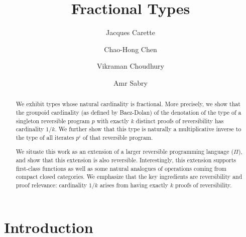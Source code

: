\documentclass[a4paper,USenglish]{lipics-v2016-utf8x}
\begin{document}
\title{Fractional Types}
\author[1]{Jacques Carette}
\author[2]{Chao-Hong Chen}
\author[3]{Vikraman Choudhury}
\author[4]{Amr Sabry}



\maketitle

\begin{abstract}
We exhibit types whose natural cardinality is fractional.  More
precisely, we show that the groupoid cardinality (as defined by
Baez-Dolan) of the denotation of the type of a singleton reversible
program $p$ with exactly $k$ distinct proofs of reversibility has
cardinality $1/k$.  We further show that this type is naturally a
multiplicative inverse to the type of all iterates $p ^ i$ of that
reversible program.

We situate this work as an extension of a larger reversible
programming language ($\Pi$), and show that this extension is also
reversible.  Interestingly, this extension supports first-class
functions as well as some natural analogues of operations coming from
compact closed categories.  We emphasize that the key ingredients are
reversibility and proof relevance: cardinality $1/k$ arises from
having exactly $k$ proofs of reversibility.
\end{abstract}

\section{Introduction}
\end{document}
